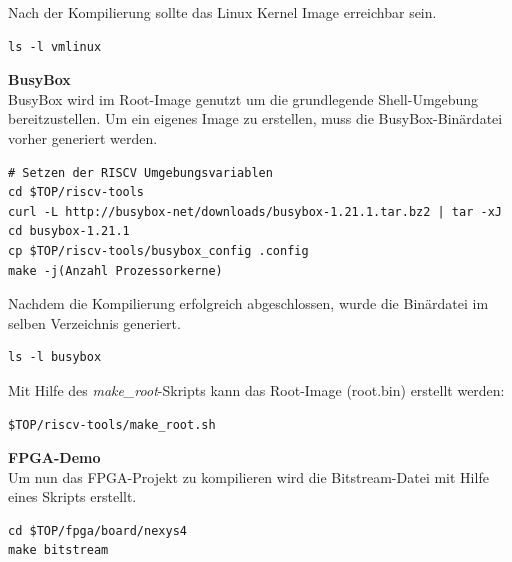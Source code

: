 \vspace{10mm}

Nach der Kompilierung sollte das Linux Kernel Image erreichbar sein.\\

\begin{lstlisting}[caption={Erreichbarkeit des Kernel-Images},label={code:kernelimage}]
ls -l vmlinux
\end{lstlisting}

\newpage
\textbf{BusyBox}\\

BusyBox wird im Root-Image genutzt um die grundlegende Shell-Umgebung bereitzustellen. Um ein eigenes Image zu erstellen, muss die BusyBox-Binärdatei vorher generiert werden.\\

\begin{lstlisting}[caption={Download der BusyBox},label={code:dowbusybox},extendedchars=false]
# Setzen der RISCV Umgebungsvariablen
cd $TOP/riscv-tools
curl -L http://busybox-net/downloads/busybox-1.21.1.tar.bz2 | tar -xJ
cd busybox-1.21.1
cp $TOP/riscv-tools/busybox_config .config
make -j(Anzahl Prozessorkerne)
\end{lstlisting}


Nachdem die Kompilierung erfolgreich abgeschlossen, wurde die Binärdatei im selben Verzeichnis generiert.\\

\begin{lstlisting}[caption={BusyBox},label={code:busybox}]
ls -l busybox
\end{lstlisting}

Mit Hilfe des \emph{make\_root}-Skripts kann das Root-Image (root.bin) erstellt werden:\\


\begin{lstlisting}[caption={Generieren des Root-Image},label={code:rootimage}]
$TOP/riscv-tools/make_root.sh
\end{lstlisting}

\textbf{FPGA-Demo}\\

Um nun das FPGA-Projekt zu kompilieren wird die Bitstream-Datei mit Hilfe eines Skripts erstellt.\\

\begin{lstlisting}[caption={Erzeugen des Bitfiles},label={code:bitfile}]
cd $TOP/fpga/board/nexys4
make bitstream
\end{lstlisting}


